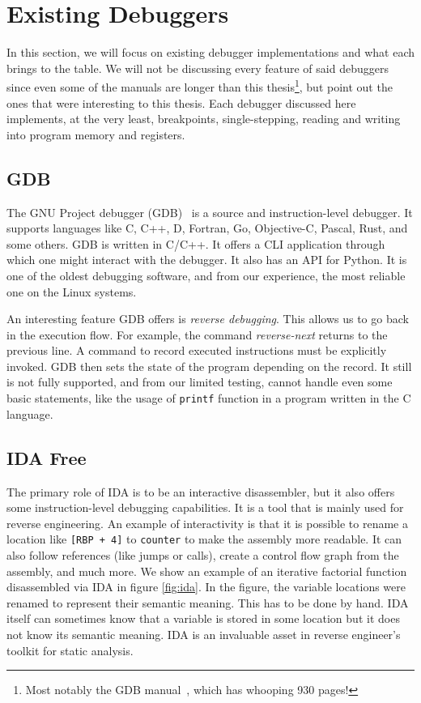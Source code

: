 \section{Existing Debuggers}
In this section, we will focus on existing debugger implementations and what
each brings to the table. We will not be discussing every feature of said
debuggers since even some of the manuals are longer than this
thesis\footnote{Most notably the GDB manual~\cite{gdb-manual}, which has
whooping 930 pages!}, but point out the ones that were interesting to this
thesis. Each debugger discussed here implements, at the very least,
breakpoints, single-stepping, reading and writing into program memory and
registers.

\subsection{GDB}
The GNU Project debugger (GDB)~\cite{gdb-manual} is a source and
instruction-level debugger. It supports languages like C, C++, D, Fortran, Go,
Objective-C, Pascal, Rust, and some others. GDB is written in C/C++. It offers
a CLI application through which one might interact with the debugger. It also
has an API for Python. It is one of the oldest debugging software, and from our
experience, the most reliable one on the Linux systems.

An interesting feature GDB offers is \textit{reverse debugging}. This allows us
to go back in the execution flow. For example, the command
\textit{reverse-next} returns to the previous line. A command to record
executed instructions must be explicitly invoked. GDB then sets the state of
the program depending on the record. It still is not fully supported, and from
our limited testing, cannot handle even some basic statements, like the usage
of \texttt{printf} function in a program written in the C language.

\subsection{IDA Free}
The primary role of IDA is to be an interactive disassembler, but it also
offers some instruction-level debugging capabilities. It is a tool that is
mainly used for reverse engineering. An example of interactivity is that it is
possible to rename a location like \texttt{[RBP + 4]} to \texttt{counter} to
make the assembly more readable. It can also follow references (like jumps or
calls), create a control flow graph from the assembly, and much more. We show
an example of an iterative factorial function disassembled via IDA in figure
\ref{fig:ida}. In the figure, the variable locations were renamed to represent
their semantic meaning. This has to be done by hand. IDA itself can sometimes
know that a variable is stored in some location but it does not know its
semantic meaning. IDA is an invaluable asset in reverse engineer's toolkit
for static analysis.


